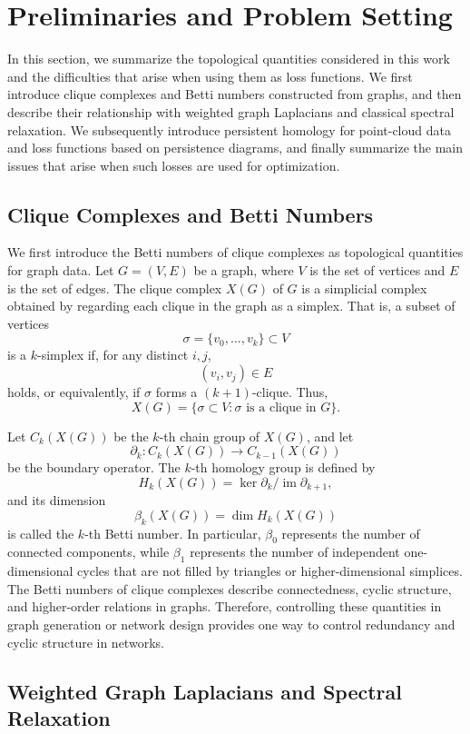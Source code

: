 \documentclass[pdflatex,sn-mathphys-num]{sn-jnl}%
\theoremstyle{thmstyleone}%
\theoremstyle{thmstyletwo}%
\theoremstyle{thmstylethree}%
\begin{document}
\section{Preliminaries and Problem Setting}

In this section, we summarize the topological quantities considered in this work and the difficulties that arise when using them as loss functions.
We first introduce clique complexes and Betti numbers constructed from graphs, and then describe their relationship with weighted graph Laplacians and classical spectral relaxation.
We subsequently introduce persistent homology for point-cloud data and loss functions based on persistence diagrams, and finally summarize the main issues that arise when such losses are used for optimization.

\subsection{Clique Complexes and Betti Numbers}

We first introduce the Betti numbers of clique complexes as topological quantities for graph data.
Let \(G=(V,E)\) be a graph, where \(V\) is the set of vertices and \(E\) is the set of edges.
The clique complex \(X(G)\) of \(G\) is a simplicial complex obtained by regarding each clique in the graph as a simplex.
That is, a subset of vertices
\[
\sigma=\{v_0,\ldots,v_k\}\subset V
\]
is a \(k\)-simplex if, for any distinct \(i,j\),
\[
(v_i,v_j)\in E
\]
holds, or equivalently, if \(\sigma\) forms a \((k+1)\)-clique.
Thus,
\[
X(G)=\{\sigma\subset V:\sigma \text{ is a clique in }G\}.
\]

Let \(C_k(X(G))\) be the \(k\)-th chain group of \(X(G)\), and let
\[
\partial_k:C_k(X(G))\to C_{k-1}(X(G))
\]
be the boundary operator.
The \(k\)-th homology group is defined by
\[
H_k(X(G))
=
\ker\partial_k/\operatorname{im}\partial_{k+1},
\]
and its dimension
\[
\beta_k(X(G))=\dim H_k(X(G))
\]
is called the \(k\)-th Betti number.
In particular, \(\beta_0\) represents the number of connected components, while \(\beta_1\) represents the number of independent one-dimensional cycles that are not filled by triangles or higher-dimensional simplices.
The Betti numbers of clique complexes describe connectedness, cyclic structure, and higher-order relations in graphs.
Therefore, controlling these quantities in graph generation or network design provides one way to control redundancy and cyclic structure in networks.

\subsection{Weighted Graph Laplacians and Spectral Relaxation}
\end{document}
